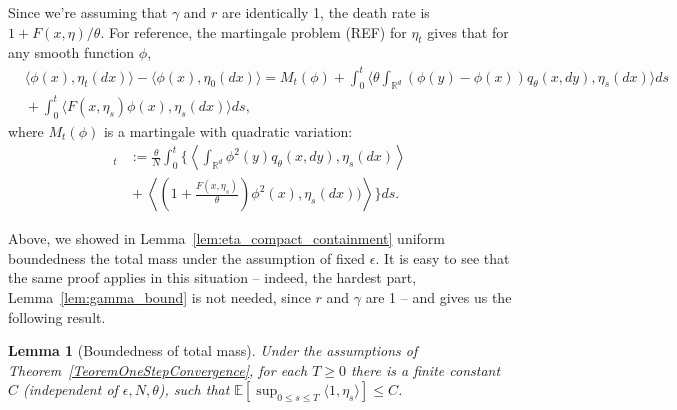 \documentclass[12pt]{article}
\newtheorem{lemma}[theorem]{Lemma}
\newcommand{\IE}{\mathbb E}
\newcommand{\IR}{\mathbb R}
\begin{document}
Since we're assuming that $\gamma$ and $r$ are identically 1,
the death rate is $1 + F(x, \eta) / \theta$.
For reference,
the martingale problem (REF) for $\eta_t$ gives that for any smooth function $\phi$,
\begin{align}
&
    \langle \phi(x), \eta_{t}(dx) \rangle
    -
    \langle \phi(x), \eta_{0}(dx)\rangle
    =
    M_t(\phi)
    +
    \int_{0}^{t} \langle \theta \int_{\IR^d}
            \left( \phi(y) -\phi(x) \right)
        q_\theta(x,dy), \eta_s(dx)
    \rangle ds
\nonumber \\
&
    {} +
    \int_0^t \langle
        F(x, \eta_s) \phi(x),
        \eta_s(dx)
    \rangle ds , \label{mgp1}
\end{align}
where $M_t(\phi)$ is a martingale with quadratic variation:
\begin{align}
[ M(\phi) ]_t
    &:=
    \frac{\theta}{N}
    \int_{0}^{t} \bigg\{
        \left\langle \int_{\IR^d} \phi^2(y) q_\theta(x,dy), \eta_s(dx) \right\rangle
    \nonumber\\
    & {} +
    \left\langle \left(1 + \frac{F(x, \eta_s)}{\theta } \right)
        \phi^2(x), \eta_s(dx)) \right\rangle 
    \bigg\} ds.  \label{mgp2}
\end{align}

Above, we showed in Lemma~\ref{lem:eta_compact_containment}
uniform boundedness the total mass under the assumption of fixed $\epsilon$.
It is easy to see that the same proof applies
in this situation -- indeed, the hardest part, Lemma~\ref{lem:gamma_bound} is not needed,
since $r$ and $\gamma$ are 1 --
and gives us the following result.

\begin{lemma}[Boundedness of total mass] \label{Lemma:UniformlyBoundedMass}
    Under the assumptions of Theorem~\ref{TeoremOneStepConvergence},
    for each $T \ge 0$ there is a finite constant $C$ (independent of $\epsilon, N, \theta$),
    such that $\IE\left[ \sup_{0 \leq s \leq T} \langle 1, \eta_s \rangle \right] \leq C$.
\end{lemma}
\end{document}
